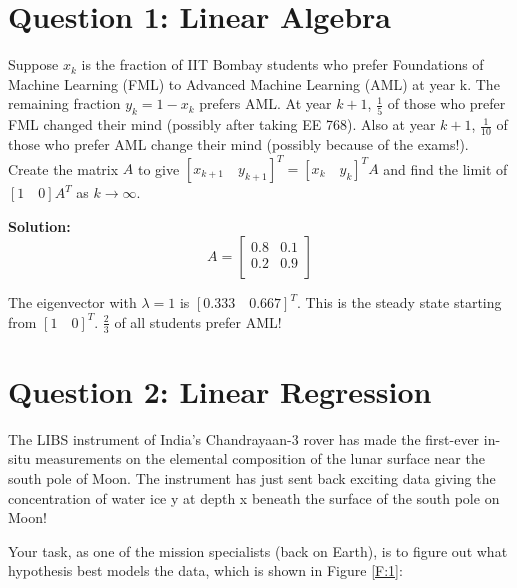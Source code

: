\documentclass[12pt]{article}
\begin{document}
	\MakeScribeTop
	
	
	\section*{Question 1: Linear Algebra}
	Suppose $x_k$ is the fraction of IIT Bombay students who prefer Foundations of Machine Learning (FML) to Advanced Machine Learning (AML) at year k. The remaining fraction $y_k = 1-x_k$ prefers AML. At year $k+1$, $\frac{1}{5}$ of those who prefer FML changed their mind (possibly after taking EE 768). Also at year $k+1$, $\frac{1}{10}$ of those who prefer AML change their mind (possibly because of the exams!). Create the matrix $A$ to give $[x_{k+1} \quad y_{k+1}]^T = [x_k \quad y_k]^TA$ and find the limit of $[1 \quad 0]A^T$ as $k \rightarrow \infty$.
	
	\begin{framed}
		\textbf{Solution:}
		\begin{equation}
			A = \begin{bmatrix}
				0.8 & 0.1 \\
				0.2 & 0.9 \\
			\end{bmatrix}
		\end{equation}
		
		The eigenvector with $\lambda = 1$ is $[0.333 \quad 0.667]^T$. This is the steady state starting from $[1 \quad 0]^T$. $\frac{2}{3}$ of all students prefer AML!
	\end{framed}
	
	\section*{Question 2: Linear Regression}
	The LIBS instrument of India's Chandrayaan-3 rover has made the first-ever in-situ measurements on the elemental composition of the lunar surface near the south pole of Moon. The instrument has just sent back exciting data giving the concentration of water ice y at depth x beneath the surface of the south pole on Moon!

	Your task, as one of the mission specialists (back on Earth), is to figure out what hypothesis best models the data, which is shown in Figure \ref{F:1}:
\end{document}
